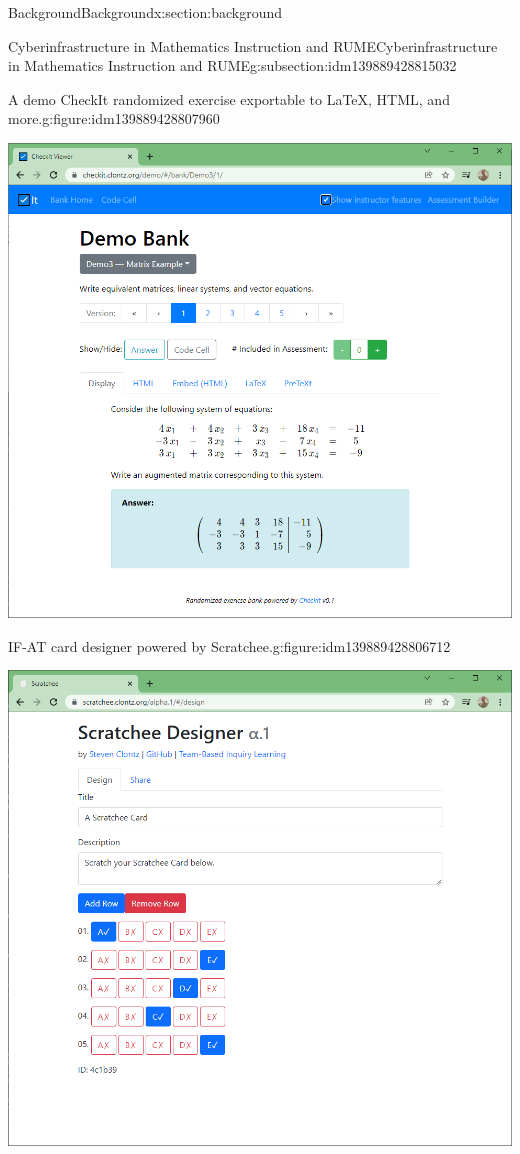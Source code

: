 \documentclass[oneside,10pt,]{article}
\begin{document}
\begin{sectionptx}{Background}{}{Background}{}{}{x:section:background}
\begin{subsectionptx}{Cyberinfrastructure in Mathematics Instruction and RUME}{}{Cyberinfrastructure in Mathematics Instruction and RUME}{}{}{g:subsection:idm139889428815032}
\begin{figureptx}{A demo CheckIt randomized exercise exportable to LaTeX, HTML, and more.}{g:figure:idm139889428807960}{}
\begin{image}{0}{1}{0}
\includegraphics[width=0.9\linewidth]{external/checkit.png}
\end{image}%
\tcblower
\end{figureptx}%
\begin{figureptx}{IF-AT card designer powered by Scratchee.}{g:figure:idm139889428806712}{}%
\begin{image}{0}{1}{0}%
\includegraphics[width=0.9\linewidth]{external/scratchee.png}
\end{image}%
\tcblower
\end{figureptx}%

\end{subsectionptx}
\end{sectionptx}
\end{document}
